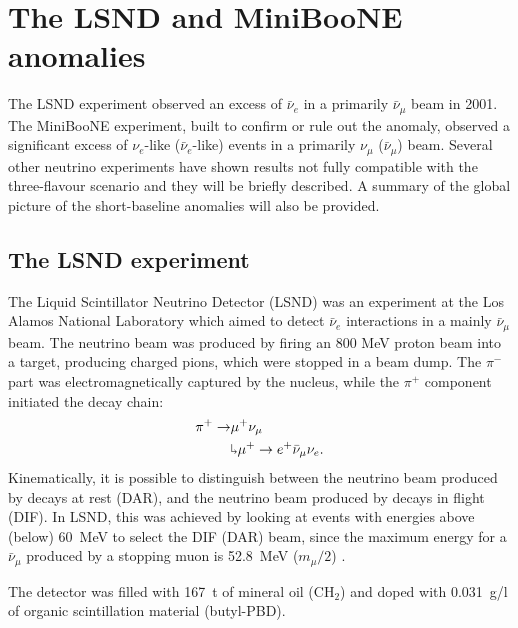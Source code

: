 \chapter{\label{ch:3-anomalies}The LSND and MiniBooNE anomalies}

\minitoc

The LSND experiment observed an excess of $\bar{\nu}_{e}$ in a primarily $\bar{\nu}_{\mu}$ beam in 2001. The MiniBooNE experiment, built to confirm or rule out the anomaly, observed a significant excess of $\nu_{e}$-like ($\bar{\nu}_{e}$-like) events in a primarily $\nu_{\mu}$ ($\bar{\nu}_{\mu}$) beam. Several other neutrino experiments have shown results not fully compatible with the three-flavour scenario and they will be briefly described.  A summary of the global picture of the short-baseline anomalies will also be provided.

\section{The LSND experiment}
The Liquid Scintillator Neutrino Detector (LSND) was an experiment at the Los Alamos National Laboratory which aimed to detect $\bar{\nu}_e$ interactions in a mainly $\bar{\nu}_{\mu}$ beam. The neutrino beam was produced by firing an 800 MeV proton beam into a target, producing charged pions, which were stopped in a beam dump. The $\pi^-$ part was electromagnetically captured by the nucleus, while the $\pi^+$ component initiated the decay chain:
\begin{align}
    \pi^+ \rightarrow & \mu^+\nu_{\mu}\\
    & \rotatebox[origin=c]{180}{$\Lsh$}	 \mu^{+} \rightarrow e^+\bar{\nu}_{\mu}\nu_{e}.
\end{align}
Kinematically, it is possible to distinguish between the neutrino beam produced by decays at rest (DAR), and the neutrino beam produced by decays in flight (DIF). In LSND, this was achieved by looking at events with energies above (below) 60~MeV to select the DIF (DAR) beam, since the maximum energy for a $\bar{\nu}_{\mu}$ produced by a stopping muon is 52.8~MeV ($m_{\mu}/2$) .

The detector was filled with 167~t of mineral oil (CH$_2$) and doped with 0.031~g/l of organic scintillation material (butyl-PBD).


